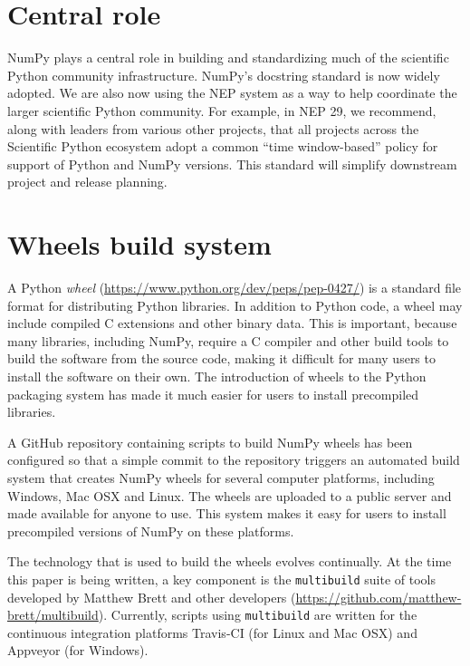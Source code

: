 \section*{Central role}

NumPy plays a central role in building and standardizing much of the scientific
Python community infrastructure.
NumPy's docstring standard is now widely adopted.
We are also now using the NEP system as a way to help coordinate the larger
scientific Python community.
For example, in NEP 29, we recommend, along with leaders from various other
projects, that all projects across the Scientific Python ecosystem adopt a
common ``time window-based'' policy for support of Python and NumPy versions.
This standard will simplify downstream project and release planning.

\section*{Wheels build system}

A Python \emph{wheel} (\url{https://www.python.org/dev/peps/pep-0427/})
is a standard file format for distributing Python libraries.
In addition to Python code, a wheel may include compiled
C extensions and other binary data.
This is important, because many libraries, including NumPy,
require a C compiler and other build tools to build the software
from the source code, making it difficult for many users to install
the software on their own.  The introduction of wheels to the Python
packaging system has made it much easier for users to install
precompiled libraries.

A GitHub repository containing scripts to build NumPy wheels has
been configured so that a simple commit to the repository triggers
an automated build system that creates NumPy wheels for several
computer platforms, including Windows, Mac OSX and Linux.  The wheels
are uploaded to a public server and made available for anyone to use.
This system makes it easy for users to install precompiled versions
of NumPy on these platforms.

The technology that is used to build the wheels evolves continually.
At the time this paper is being written, a key component is the
\texttt{multibuild} suite of tools developed by Matthew Brett and
other developers (\url{https://github.com/matthew-brett/multibuild}).
Currently, scripts using \texttt{multibuild} are written for
the continuous integration platforms Travis-CI (for Linux and Mac OSX)
and Appveyor (for Windows).

